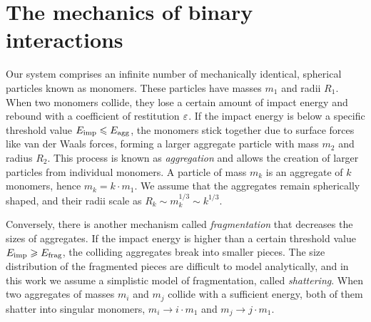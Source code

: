 \documentclass[aps,prl,preprint,groupedaddress,10pt]{revtex4-2}
\begin{document}
\section{The mechanics of binary interactions}
Our system comprises an infinite number of mechanically identical, spherical particles
known as monomers. These particles have masses $m_1$ and radii $R_1$. When two
monomers collide, they lose a certain amount of impact energy and rebound with a
coefficient of restitution $\varepsilon$. If the impact energy is below a specific threshold
value $E_{\mathrm{imp}}\leqslant E_{\mathrm{agg}}$, the monomers stick together due to surface
forces like van der Waals forces, forming a larger aggregate particle with mass $m_2$
and radius $R_2$. This process is known as \emph{aggregation} and allows the creation
of larger particles from individual monomers. A particle of mass $m_k$ is an aggregate
of $k$ monomers, hence $m_k=k\cdot m_1$. We assume that the aggregates remain
spherically shaped, and their radii scale as $R_k\sim m_k^{1/3}\sim k^{1/3}$.

Conversely, there is another mechanism called \emph{fragmentation} that decreases the
sizes of aggregates. If the impact energy is higher than a certain threshold value
$E_{\mathrm{imp}}\geqslant E_{\mathrm{frag}}$, the colliding aggregates break into smaller pieces.
The size distribution of the fragmented pieces are difficult to model analytically, and
in this work we assume a simplistic model of fragmentation, called \emph{shattering}.
When two aggregates of masses $m_i$ and $m_j$ collide with a sufficient energy, both
of them shatter into singular monomers, $m_i\to i\cdot m_1$ and $m_j\to j\cdot m_1$.
\end{document}
